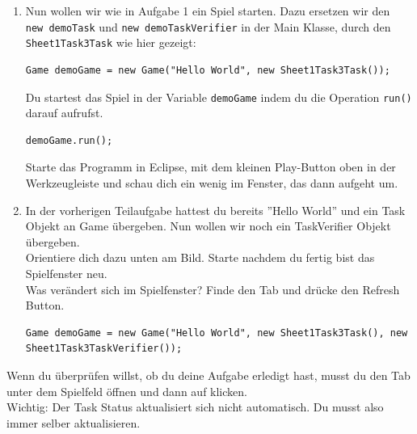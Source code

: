 
\label{ex3}

\begin{enumerate}
    \item Nun wollen wir wie in Aufgabe 1 ein Spiel starten. Dazu ersetzen wir den \lstinline{ new demoTask} und \lstinline{new demoTaskVerifier} in der Main Klasse, durch 
        den \lstinline{Sheet1Task3Task} wie hier gezeigt:

    \begin{lstlisting}
Game demoGame = new Game("Hello World", new Sheet1Task3Task());
    \end{lstlisting}

    Du startest das Spiel in der Variable \lstinline{demoGame} indem du die Operation \lstinline{run()} darauf aufrufst.

    \begin{lstlisting}
demoGame.run();
    \end{lstlisting}

    Starte das Programm in Eclipse, mit dem kleinen Play-Button oben in der Werkzeugleiste und schau dich ein wenig im Fenster, das dann aufgeht um.

    \vspace{5mm}

    \item In der vorherigen Teilaufgabe hattest du bereits ''Hello World'' und ein Task Objekt an Game übergeben.
        Nun wollen wir noch ein TaskVerifier Objekt übergeben.\\
        Orientiere dich dazu unten am Bild. Starte nachdem du fertig bist das Spielfenster neu. \\

        Was verändert sich im Spielfenster?
        Finde den  Tab und drücke den Refresh Button.

    \begin{lstlisting}
Game demoGame = new Game("Hello World", new Sheet1Task3Task(), new Sheet1Task3TaskVerifier());
    \end{lstlisting}

\end{enumerate}


\begin{Infobox}
    Wenn du überprüfen willst, ob du deine Aufgabe erledigt hast, musst du den  Tab unter dem Spielfeld öffnen und dann auf  klicken.\\

    Wichtig: Der Task Status aktualisiert sich nicht automatisch. Du musst also immer selber aktualisieren.
\end{Infobox}


